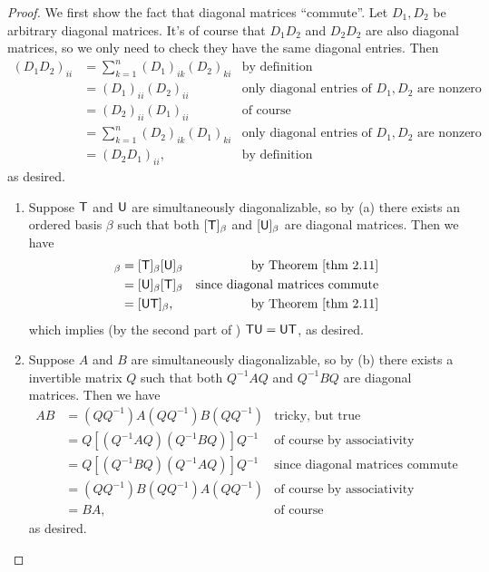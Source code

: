 \begin{proof}
We first show the fact that diagonal matrices ``commute''.
Let \(D_1, D_2\) be arbitrary diagonal matrices.
It's of course that \(D_1 D_2\) and \(D_2 D_2\) are also diagonal matrices, so we only need to check they have the same diagonal entries.
Then
\begin{align*}
    (D_1 D_2)_{ii} & = \sum_{k = 1}^n (D_1)_{ik} (D_2)_{ki} & \text{by definition} \\
        & = (D_1)_{ii} (D_2)_{ii} & \text{only diagonal entries of \(D_1, D_2\) are nonzero} \\
        & = (D_2)_{ii} (D_1)_{ii} & \text{of course} \\
        & = \sum_{k = 1}^n (D_2)_{ik} (D_1)_{ki} & \text{only diagonal entries of \(D_1, D_2\) are nonzero} \\
        & = (D_2 D_1)_{ii}, & \text{by definition}
\end{align*}
as desired.

\begin{enumerate}
\item Suppose \(\textsf{T}\) and \(\textsf{U}\) are simultaneously diagonalizable, so by (a) there exists an ordered basis \(\beta\) such that both \([\textsf{T}]_{\beta}\) and \([\textsf{U}]_{\beta}\) are diagonal matrices.
Then we have
\begin{align*}
    [\T\U]_{\beta} & = [\T]_{\beta} [\U]_{\beta} & \text{by \THM{2.11}} \\
        & = [\U]_{\beta} [\T]_{\beta} & \text{since diagonal matrices commute} \\
        & = [\U\T]_{\beta}, & \text{by \THM{2.11}}
\end{align*}
which implies (by the second part of ) \(\textsf{T}\textsf{U} = \textsf{U}\textsf{T}\), as desired.

\item Suppose \(A\) and \(B\) are simultaneously diagonalizable, so by (b) there exists a invertible matrix \(Q\) such that both \(Q^{-1} A Q\) and \(Q^{-1} B Q\) are diagonal matrices.
Then we have
\begin{align*}
    AB & = (QQ^{-1}) A (QQ^{-1}) B (QQ^{-1}) & \text{tricky, but true} \\
       & = Q \left[ (Q^{-1} A Q) (Q^{-1} B Q) \right] Q^{-1} & \text{of course by associativity} \\
       & = Q \left[ (Q^{-1} B Q) (Q^{-1} A Q) \right] Q^{-1} & \text{since diagonal matrices commute} \\
       & = (QQ^{-1}) B (QQ^{-1}) A (QQ^{-1}) & \text{of course by associativity} \\
       & = BA, & \text{of course}
\end{align*}
as desired.
\end{enumerate}
\end{proof}

